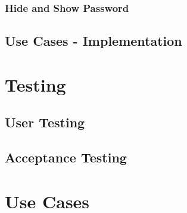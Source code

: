 \documentclass[12pt]{article}
\begin{document}
	\subsubsection{Hide and Show Password}
	
	\subsection{Use Cases - Implementation}
	
	\section{Testing}
	\label{use-case-implementation}
	\subsection{User Testing}
	\subsection{Acceptance Testing}
	\cite{humbleContinuousDeliveryReliable2010}
	
	
	\printbibliography
	\pagebreak
	
	\appendix
	\appendixpage
	\section{Use Cases}
	\label{chap:use-cases}
		
\end{document}
